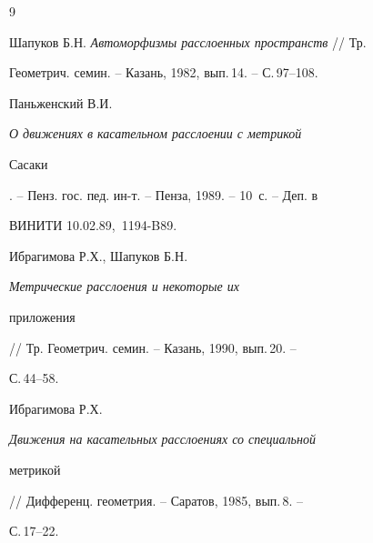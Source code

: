 \begin{thebibliography}{9}







Шапуков Б.Н. {\em Автоморфизмы расслоенных пространств} // Тр.


Геометрич. семин. -- Казань, 1982, вып.\,14. -- С.\,97--108.




Паньженский В.И. {\em О движениях в касательном расслоении с метрикой


Сасаки}. -- Пенз. гос. пед. ин-т. -- Пенза, 1989. -- 10~с. -- Деп. в


ВИНИТИ 10.02.89, \No\,1194-B89.




Ибрагимова Р.Х., Шапуков Б.Н. {\em Метрические расслоения и некоторые их


приложения} // Тр. Геометрич. семин. -- Казань, 1990, вып.\,20. --


С.\,44--58.




Ибрагимова Р.Х. {\em Движения на касательных расслоениях со специальной


метрикой} // Дифференц. геометрия. -- Саратов, 1985, вып.\,8. --


С.\,17--22.





\end{thebibliography}





\vskip 2cm












\label{end}





